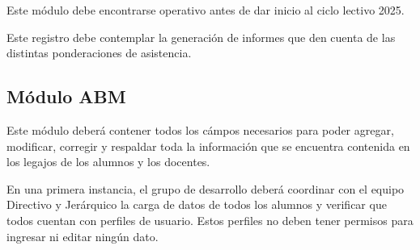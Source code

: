Este módulo debe encontrarse operativo antes de dar inicio al ciclo lectivo 2025.

Este registro debe contemplar la generación de informes que den cuenta de las distintas ponderaciones de asistencia.

\subsection{Módulo ABM}

Este módulo deberá contener todos los cámpos necesarios para poder agregar, modificar, corregir y respaldar toda la información que se encuentra contenida en los legajos de los alumnos y los docentes.

En una primera instancia, el grupo de desarrollo deberá coordinar con el equipo Directivo y Jerárquico la carga de datos de todos los alumnos y verificar que todos cuentan con perfiles de usuario. Estos perfiles no deben tener permisos para ingresar ni editar ningún dato.
